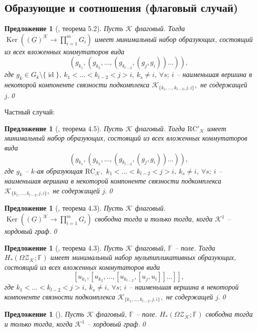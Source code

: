 \documentclass[10pt,a4paper]{article}
\DeclareMathOperator{\id}{id}
\DeclareMathOperator{\Ker}{Ker}
\def\FF{\mathbb{F}}
\def\RC{\mathrm{RC}}
\def\Z{\mathcal{Z}}
\def\K{\mathcal{K}}
\def\ZK{\Z_\K}
\def\RCK{\RC_\K}
\def\OZK{\Omega\ZK}
\newtheorem{prp}[thm]{Предложение}
\theoremstyle{definition}
\begin{document}
\subsection{Образующие и соотношения (флаговый случай)}

\begin{prp}[\cite{pv_artin}, теорема 5.2]
Пусть $\K$ флаговый. Тогда $\Ker((\underline{G})^\K\to\prod_{i=1}^m G_i)$ имеет минимальный набор образующих, состоящий из всех вложенных коммутаторов вида
$$(g_{k_1},(g_{k_2},\dots,(g_{k_{l-2}},(g_j,g_i))\dots)),$$
где $g_k\in G_k\setminus\{\id\},~k_1<\dots<k_{l-2}<j>i,~k_s\neq i,~\forall s;~i$ -- наименьшая вершина в некоторой компоненте связности подкомплекса $\K_{\{k_1,\dots,k_{l-2},j,i\}},$ не содержащей $j.$\qed
\end{prp}
Частный случай:
\begin{prp}[\cite{pv}, теорема 4.5]
Пусть $\K$ флаговый. Тогда $\RC'_\K$ имеет минимальный набор образующих, состоящий из всех вложенных коммутаторов вида
$$(g_{k_1},(g_{k_2},\dots,(g_{k_{l-2}},(g_j,g_i))\dots)),$$
где $g_k$ -- $k$-ая образующая $\RCK,$ $k_1<\dots<k_{l-2}<j>i,~k_s\neq i,~\forall s;~i$ -- наименьшая вершина в некоторой компоненте связности подкомплекса $\K_{\{k_1,\dots,k_{l-2},j,i\}},$ не содержащей $j.$\qed
\end{prp}

\begin{prp}[\cite{pv}, теорема 4.3]
Пусть $\K$ флаговый. $\Ker((\underline{G})^\K\to\prod_{i=1}^m G_i)$ свободна тогда и только тогда, когда $\K^1$ -- хордовый граф.\qed
\end{prp}

\begin{prp}[\cite{gptw}, теорема 4.3]
Пусть $\mathcal{K}$ флаговый, $\FF$ -- поле. Тогда $H_*(\OZK;\mathbb{F})$ имеет минимальный набор мультипликативных образующих, состоящий из всех вложенных коммутаторов вида
$$[u_{k_1},[u_{k_2},\dots,[u_{k_{l-2}},[u_j,u_i]]\dots]],$$
где $k_1<\dots<k_{l-2}<j>i,~k_s\neq i,~\forall s;~i$ -- наименьшая вершина в некоторой компоненте связности подкомплекса $\K_{\{k_1,\dots,k_{l-2},j,i\}},$ не содержащей $j.$\qed
\end{prp}
\begin{prp}[\cite{gptw}]
Пусть $\K$ флаговый, $\FF$ -- поле. $H_*(\OZK;\mathbb{F})$ свободна тогда и только тогда, когда $\K^1$ -- хордовый граф.\qed
\end{prp}
\end{document}
